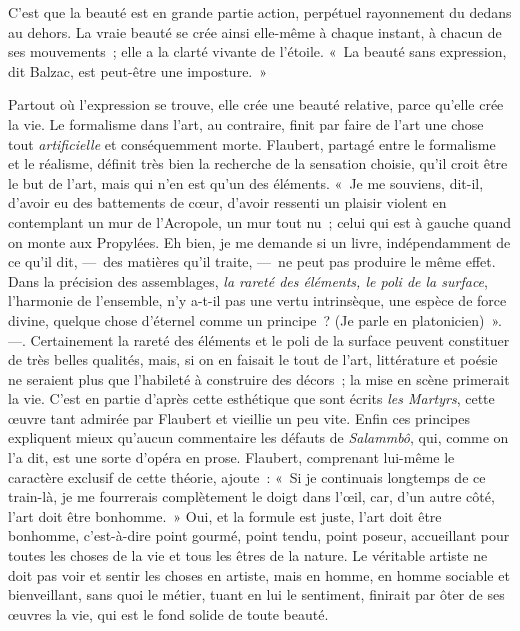 \documentclass[french,twoside]{book} %
\begin{document}
\noindent C’est que la beauté est en grande partie action, perpétuel rayonnement du dedans au dehors. La vraie beauté se crée ainsi elle-même à chaque instant, à chacun de ses mouvements ; elle a la clarté vivante de l’étoile. « La beauté sans expression, dit Balzac, est peut-être une imposture. »\par
Partout où l’expression se trouve, elle crée une beauté relative, parce qu’elle crée la vie. Le formalisme dans l’art, au contraire, finit par faire de l’art une chose tout \emph{artificielle} et conséquemment morte. Flaubert, partagé entre le formalisme et le réalisme, définit très bien la recherche de la sensation choisie, qu’il croit être le but de l’art, mais qui n’en est qu’un des éléments. « Je me souviens, dit-il, d’avoir eu des battements de cœur, d’avoir ressenti un plaisir violent en contemplant un mur de l’Acropole, un mur tout nu ; celui qui est à gauche quand on monte aux Propylées. Eh bien, je me demande si un livre, indépendamment de ce qu’il dit, — des matières qu’il traite, — ne peut pas produire le même effet. Dans la précision des assemblages, \emph{la rareté des éléments, le poli de la surface}, l’harmonie de l’ensemble, n’y a-t-il pas une vertu intrinsèque, une espèce de force divine, quelque chose d’éternel comme un principe ? (Je parle en platonicien) ». —. Certainement la rareté des éléments et le poli de la surface peuvent constituer de très belles qualités, mais, si on en faisait le tout de l’art, littérature et poésie ne seraient plus que l’habileté à construire des décors ; la mise en scène primerait la vie. C’est en partie d’après cette esthétique que sont écrits \emph{les Martyrs}, cette œuvre tant admirée par Flaubert et vieillie un peu vite. Enfin ces principes expliquent mieux qu’aucun commentaire les défauts de \emph{Salammbô}, qui, comme on l’a dit, est une sorte d’opéra en prose. Flaubert, comprenant lui-même le caractère exclusif de cette théorie, ajoute : « Si je continuais longtemps de ce train-là, je me fourrerais complètement le doigt dans l’œil, car, d’un autre côté, l’art doit être bonhomme. » Oui, et la formule est juste, l’art doit être bonhomme, c’est-à-dire point gourmé, point tendu, point poseur, accueillant pour toutes les choses de la vie et tous les êtres de la nature. Le véritable artiste ne doit pas voir et sentir les choses en artiste, mais en homme, en homme sociable et bienveillant, sans quoi le métier, tuant en lui le sentiment, finirait par ôter de ses œuvres la vie, qui est le fond solide de toute beauté.\par
\end{document}
